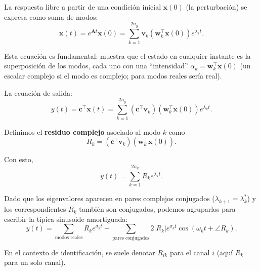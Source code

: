 \documentclass{beamer}
\begin{document}
\begin{frame}

La respuesta libre a partir de una condición inicial $\mathbf{x}(0)$ (la perturbación) se expresa como suma de modos:
\begin{equation}
\mathbf{x}(t) = e^{\mathbf{A}t}\mathbf{x}(0) = \sum_{k=1}^{2n_g} \mathbf{v}_k \left( \mathbf{w}_k^\top \mathbf{x}(0) \right) e^{\lambda_k t}.
\end{equation}

Esta ecuación es fundamental: muestra que el estado en cualquier instante es la superposición de los modos, cada uno con una ``intensidad'' $\alpha_k = \mathbf{w}_k^\top \mathbf{x}(0)$ (un escalar complejo si el modo es complejo; para modos reales sería real).


\end{frame}

\begin{frame}
La ecuación de salida:
\[
y(t) = \mathbf{c}^\top \mathbf{x}(t) = \sum_{k=1}^{2n_g} \left( \mathbf{c}^\top \mathbf{v}_k \right) \left( \mathbf{w}_k^\top \mathbf{x}(0) \right) e^{\lambda_k t}.
\]

Definimos el \textbf{residuo complejo} asociado al modo $k$ como
\begin{equation}
\boxed{R_k = \left( \mathbf{c}^\top \mathbf{v}_k \right) \left( \mathbf{w}_k^\top \mathbf{x}(0) \right)}.
\end{equation}

Con esto,
\[
y(t) = \sum_{k=1}^{2n_g} R_k e^{\lambda_k t}.
\]


\end{frame}

\begin{frame}
    Dado que los eigenvalores aparecen en pares complejos conjugados ($\lambda_{k+1} = \lambda_k^*$) y los correspondientes $R_k$ también son conjugados, podemos agruparlos para escribir la típica sinusoide amortiguada:
\[
y(t) = \sum_{\text{modos reales}} R_k e^{\sigma_k t} + \sum_{\text{pares conjugados}} 2 |R_k| e^{\sigma_k t} \cos(\omega_k t + \angle R_k).
\]

En el contexto de identificación, se suele denotar $R_{ik}$ para el canal $i$ (aquí $R_k$ para un solo canal).



\end{frame}
\end{document}
